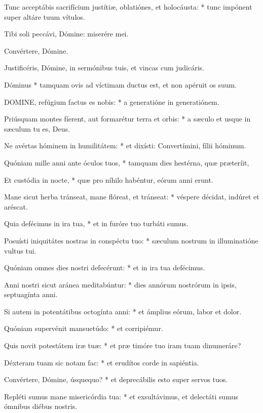 Tunc acceptábis sacrifícium justítiæ, oblatiónes, et holocáusta: * tunc impónent super altáre tuum vítulos.

 Tibi soli peccávi, Dómine: miserére mei.

 Convértere, Dómine.


 Justificéris, Dómine, in sermónibus tuis, et vincas cum judicáris.

 Dóminus * tamquam ovis ad víctimam ductus est, et non apéruit os suum.


\lettrine[lines=2]{D}{OMINE}, refúgium factus es nobis: * a generatióne in generatiónem.

Priúsquam montes fíerent, aut formarétur terra et orbis: * a sæculo et usque in sæculum tu es, Deus.

Ne avértas hóminem in humilitátem: * et dixísti: Convertímini, fílii hóminum.

Quóniam mille anni ante óculos tuos, * tamquam dies hestérna, quæ præteríit,

Et custódia in nocte, * quæ pro níhilo habéntur, eórum anni erunt.

Mane sicut herba tránseat, mane flóreat, et tránseat: * véspere décidat, indúret et aréscat.

Quia defécimus in ira tua, * et in furóre tuo turbáti sumus.

Posuísti iniquitátes nostras in conspéctu tuo: * sæculum nostrum in illuminatióne vultus tui.

Quóniam omnes dies nostri defecérunt: * et in ira tua defécimus.

Anni nostri sicut aránea meditabúntur: * dies annórum nostrórum in ipsis, septuagínta anni.

Si autem in potentátibus octogínta anni: * et ámplius eórum, labor et dolor.

Quóniam supervénit mansuetúdo: * et corripiémur.

Quis novit potestátem iræ tuæ: * et præ timóre tuo iram tuam dinumeráre?

Déxteram tuam sic notam fac: * et erudítos corde in sapiéntia.

Convértere, Dómine, úsquequo? * et deprecábilis esto super servos tuos.

Repléti sumus mane misericórdia tua: * et exsultávimus, et delectáti sumus ómnibus diébus nostris.

